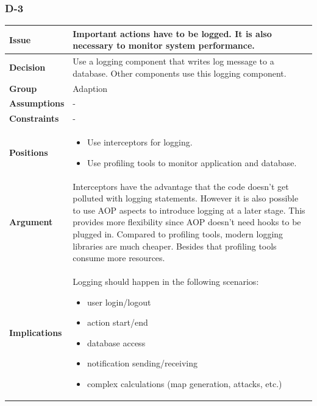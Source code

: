 \documentclass[11pt]{article}
\begin{document}
\newpage

\subsubsection{D-3}

\begin{table}[h] \small
	\begin{tabularx}{\textwidth}{ | l | X |}
    	\hline
	\cellcolor[gray]{0.9}
    	\textbf{Issue} & Important actions have to be logged. It is also necessary to monitor system performance. \\
	\hline
	\cellcolor[gray]{0.9}
	\textbf{Decision} & Use a logging component that writes log message to a database. Other components use this logging component. \\
	\hline
	\cellcolor[gray]{0.9}
	\textbf{Group} & Adaption \\
	\hline
	\cellcolor[gray]{0.9}
	\textbf{Assumptions} & - \\
	\hline
	\cellcolor[gray]{0.9}
	\textbf{Constraints} & - \\
	\hline
	\cellcolor[gray]{0.9}
	\textbf{Positions} &
		\begin{itemize}
		\item Use interceptors for logging.
		\item Use profiling tools to monitor application and database.
		\end{itemize}\\
	\hline
	\cellcolor[gray]{0.9}
	\textbf{Argument} & Interceptors have the advantage that the code doesn't get polluted with logging statements. However it is also possible to use AOP aspects to introduce logging at a later stage. This provides more flexibility since AOP doesn't need hooks to be plugged in.  Compared to profiling tools, modern logging libraries are much cheaper. Besides that profiling tools consume more resources. \\
	\hline
	\cellcolor[gray]{0.9}
	\textbf{Implications} & Logging should happen in the following scenarios:
		\begin{itemize}
		\item user login/logout
		\item action start/end
		\item database access
		\item notification sending/receiving
		\item complex calculations (map generation, attacks, etc.)
		\end{itemize}\\

\end{tabularx}
\end{table}
\end{document}
